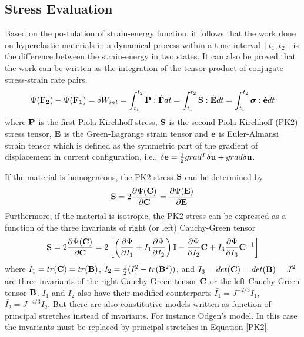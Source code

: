 \subsection{Stress Evaluation} \label{general_stress}
Based on the postulation of strain-energy function, it follows that the work done on hyperelastic materials in a dynamical process within a time interval $[t_1, t_2]$ is the difference between the strain-energy in two states. It can also be proved that the work can be written as the integration of the tensor product of conjugate stress-strain rate pairs.
\begin{equation}
\Psi({\bold{F_2}}) - \Psi({\bold{F_1}}) = \delta{W_{int}} = \int_{t_1}^{t_2}\bold{P}:\dot{\bold{F}}dt = \int_{t_1}^{t_2}\bold{S}:\dot{\bold{E}}dt = 
\int_{t_1}^{t_2}\boldsymbol{\sigma}:\dot{\bold{e}}dt
\end{equation}
where $\bold{P}$ is the first Piola-Kirchhoff stress, $\bold{S}$ is the second Piola-Kirchhoff (PK2) stress tensor, $\bold{E}$ is the Green-Lagrange strain tensor and $\bold{e}$ is Euler-Almansi strain tensor which is defined as the symmetric part of the gradient of displacement in current configuration, i.e., $\delta\bold{e} = \frac{1}{2}{ grad^T\delta\bold{u} + grad\delta\bold{u}}$.

If the material is homogeneous, the PK2 stress $\bold{S}$ can be determined by 
\begin{equation}
\bold{S} = 2\frac{\partial\Psi(\bold{C})}{\partial{\bold{C}}} = \frac{\partial\Psi(\bold{E})}{\partial{\bold{E}}}
\end{equation}
Furthermore, if the material is isotropic, the PK2 stress can be expressed as a function of the three invariants of right (or left) Cauchy-Green tensor
\begin{equation} \label{PK2}
\bold{S} = 2\frac{\partial\Psi({\bold{C})}}{\partial{\bold{C}}} = 2\left[\left( \frac{\partial\Psi}{\partial{I_1}} + I_1 \frac{\partial\Psi}{\partial{I_2}} \right)\bold{I} -  \frac{\partial\Psi}{\partial{I_2}}\bold{C} + I_3 \frac{\partial\Psi}{\partial{I_3}}{\bold{C}}^{-1} \right]
\end{equation}
where $I_1 = tr(\bold{C}) = tr(\bold{B})$, $I_2 = \frac{1}{2}(I_1^2 - tr(\bold{B}^2))$, and $I_3 = det(\bold{C}) = det(\bold{B}) = J^2$ are three invariants of the right Cauchy-Green tensor $\bold{C}$ or the left Cauchy-Green tensor $\bold{B}$. $I_1$ and $I_2$ also have their modified counterparts $\bar{I_1} = J^{-2/3}I_1$, $\bar{I_2} = J^{-4/3}I_2$. But there are also constitutive models written as function of principal stretches instead of invariants. For instance Odgen's model. In this case the invariants must be replaced by principal stretches in Equation \ref{PK2}.

